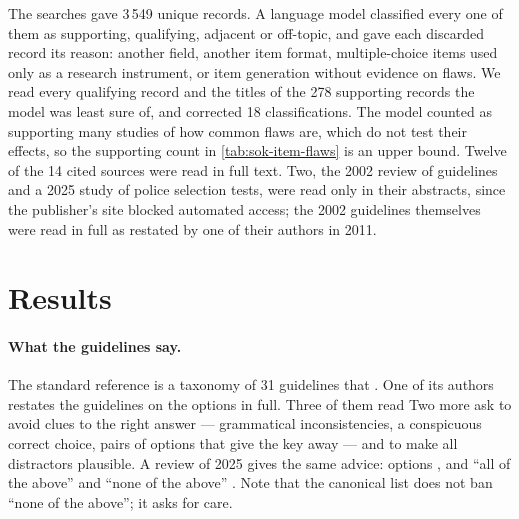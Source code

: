 The searches gave 3\,549 unique records.  A language model classified
every one of them as supporting, qualifying, adjacent or off-topic, and
gave each discarded record its reason: another field, another item format,
multiple-choice items used only as a research instrument, or item
generation without evidence on flaws.  We read every qualifying record and
the titles of the 278 supporting records the model was least sure of, and
corrected 18 classifications.  The model counted as supporting many
studies of how common flaws are, which do not test their effects, so the
supporting count in \cref{tab:sok-item-flaws} is an upper bound.  Twelve
of the 14 cited sources were read in full text.  Two, the 2002 review of
guidelines and a 2025 study of police selection tests, were read only in
their abstracts, since the publisher's site blocked automated access; the
2002 guidelines themselves were read in full as restated by one of their
authors in 2011.

\section{Results}
\label{sec:item-flaws-results}

\paragraph{What the guidelines say.} The standard reference is a taxonomy
of 31 guidelines that .  One of its authors restates the guidelines on the
options in full.  Three of them read
  Two more ask to avoid clues to the right answer ---
grammatical inconsistencies, a conspicuous correct choice, pairs of
options that give the key away --- and to make all distractors
plausible\autocite[205--206]{Rodriguez2011}.  A review of 2025 gives the
same advice: options , and \enquote{all of the
above} and \enquote{none of the above}
.  Note that
the canonical list does not ban \enquote{none of the above}; it asks for
care.

